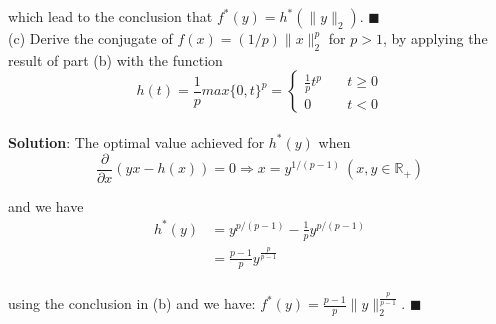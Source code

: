 \documentclass{article}
\begin{document}

which lead to the conclusion that $f^*(y) = h^*(\|y\|_2)$. $\blacksquare$ \\

(c) Derive the conjugate of $f(x) = (1/p)\|x\|^p_2$ for $p > 1$, by applying the result of part (b) with the function
\[
	h(t) = \frac{1}{p}max\{0,t\}^p =
	\begin{cases}
		\frac{1}{p}t^p & \quad t \geq 0 \\
		0              & \quad t < 0
	\end{cases}
\] \\

\textbf{Solution}:
The optimal value achieved for $h^*(y)$ when
\[
	\frac{\partial}{\partial x} (yx - h(x)) = 0 \Rightarrow
	x = y^{1/(p-1)}\ (x,y \in \mathbb{R}_+)
\]

and we have
\begin{align*}
	h^*(y) &= y^{p/(p-1)} - \frac{1}{p} y^{p/(p-1)} \\
	& = \frac{p-1}{p} y^{\frac{p}{p-1}} \\
\end{align*}

using the conclusion in (b) and we have: $f^*(y) = \frac{p-1}{p} \|y\|_2^{\frac{p}{p-1}} $. $\blacksquare$
\end{document}
